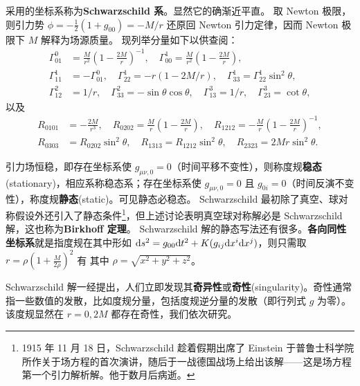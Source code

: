 采用的坐标系称为\textbf{Schwarzschild 系}。显然它的确渐近平直。
取 Newton 极限，则引力势 $\phi=-\frac 12(1+g_{00})=-M/r$ 还原回 Newton 引力定律，因而 Newton 极限下 $M$ 解释为场源质量。
现列举分量如下以供查阅：
\begin{align*}
    \Gamma_{01}^0&=\frac{M}{r^2}\left(1-\frac{2M}{r}\right)^{-1}, \quad \Gamma_{00}^1=\frac{M}{r^2}\left(1-\frac{2M}{r}\right), \\
    \Gamma_{11}^1&=-\Gamma_{01}^0,\quad\Gamma_{22}^1=-r(1-{2M}/{r}),\quad\Gamma_{33}^1=\Gamma_{22}^1\sin ^2 \theta, \\
    \Gamma_{12}^2&=1 / r,\quad\Gamma_{33}^2=-\sin \theta \cos \theta,\quad\Gamma_{13}^3=1 / r,\quad\Gamma_{23}^3=\cot \theta,
\end{align*}
以及
\begin{align*}
    R_{0101}&=-\frac{2 M}{r^3}, \quad R_{0202}=\frac{M}{r}\left(1-\frac{2M}{r}\right), \quad R_{1212}=-\frac{M}{r}\left(1-\frac{2M}{r}\right)^{-1}, \\
    R_{0303}&=R_{0202} \sin ^2 \theta, \quad R_{1313}=R_{1212} \sin ^2 \theta, \quad R_{2323}=2 M r \sin ^2 \theta.
\end{align*}

引力场恒稳，即存在坐标系使 $g_{\mu\nu,0}=0$（时间平移不变性），则称度规\textbf{稳态}(stationary)，相应系称稳态系；存在坐标系使 $g_{\mu\nu,0}=0$ 且 $g_{0i}=0$（时间反演不变性），称度规\textbf{静态}(static)。可见静态必稳态。
Schwarzschild 最初除了真空、球对称假设外还引入了静态条件\footnote{1915 年 11 月 18 日，Schwarzschild 趁着假期出席了 Einstein 于普鲁士科学院所作关于场方程的首次演讲，随后于一战德国战场上给出该解——这是场方程第一个引力解析解。他于数月后病逝。}，但上述讨论表明真空球对称解必是 Schwarzschild 解，这也称为\textbf{Birkhoff 定理}。
Schwarzschild 解的静态写法还有很多。\textbf{各向同性坐标系}就是指度规在其中形如 $\dd s^2=g_{00}\dd t^2+K(g_{ij}\dd x^i\dd x^j)$，则只需取 $r=\rho(1+\frac{M}{2\rho})^2$ 有
其中 $\rho=\sqrt{x^2+y^2+z^2}$。

Schwarzschild 解一经提出，人们立即发现其\textbf{奇异性}或\textbf{奇性}(singularity)。奇性通常指一些数值的发散，比如度规分量，包括度规逆分量的发散（即行列式 $g$ 为零）。该度规显然在 $r=0,2M$ 都存在奇性，我们依次研究。

